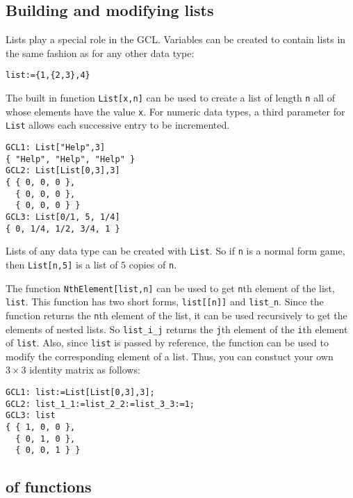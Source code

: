 \subsection{Building and modifying lists}
Lists play a special role in the GCL.  Variables can be created to
contain lists in the same fashion as for any other data type:  

\begin{verbatim}
list:={1,{2,3},4}
\end{verbatim}

The built in function \verb+List[x,n]+ can be used to
create a list of length \verb+n+ all of whose elements have the value
\verb+x+.  For numeric data types, a third parameter for \verb+List+
allows each successive entry to be incremented.

\begin{verbatim}
GCL1: List["Help",3]
{ "Help", "Help", "Help" }
GCL2: List[List[0,3],3]
{ { 0, 0, 0 },
  { 0, 0, 0 },
  { 0, 0, 0 } }
GCL3: List[0/1, 5, 1/4]
{ 0, 1/4, 1/2, 3/4, 1 }
\end{verbatim}

\noindent
Lists of any data type can be created with \verb+List+.  So if
\verb+n+ is a normal form game, then \verb+List[n,5]+ is a list of $5$
copies of \verb+n+.

The function \verb+NthElement[list,n]+ can be used
to get \verb+n+th element of the list, \verb+list+.  This function has
two short forms, \verb+list[[n]]+ and \verb+list_n+.  Since the
function returns the \verb+n+th element of the list, it can be used
recursively to get the elements of nested lists.  So \verb+list_i_j+
returns the \verb+j+th element of the \verb+i+th element of
\verb+list+.  Also, since \verb+list+ is passed by reference, the
function can be used to modify the corresponding element of a list.
Thus, you can constuct your own $3\times 3$ identity matrix as
follows:

\begin{verbatim}
GCL1: list:=List[List[0,3],3];
GCL2: list_1_1:=list_2_2:=list_3_3:=1;
GCL3: list
{ { 1, 0, 0 },
  { 0, 1, 0 },
  { 0, 0, 1 } }
\end{verbatim}

\subsection{ of functions}

